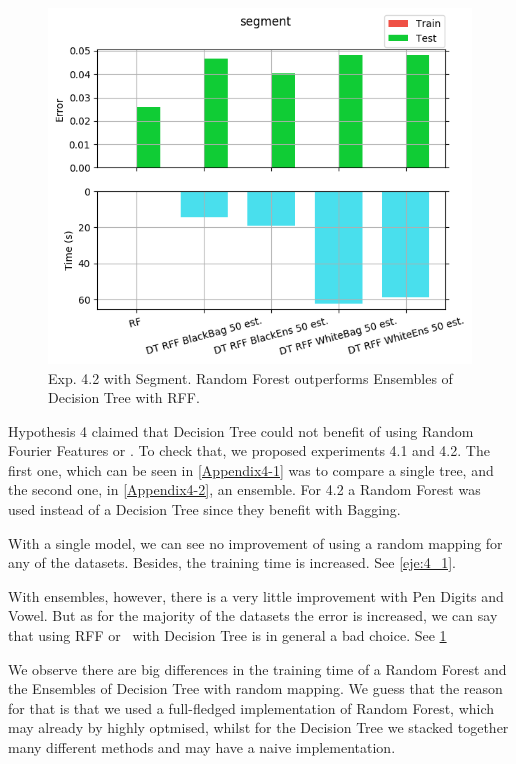 \begin{pre-delivery}
\begin{figure}[th]
\centering
\includegraphics[scale=0.6]{Figures/4_2/rff/segment}
\decoRule
\caption{Exp. 4.2 with Segment. Random Forest outperforms Ensembles of Decision Tree with RFF.}
\label{eje:4_2}
\end{figure}


Hypothesis 4 claimed that Decision Tree could not benefit of using
Random Fourier Features or \Nys. To check that, we proposed experiments
4.1 and 4.2. The first one, which can be seen in \ref{Appendix4-1} was
to compare a single tree, and the second one, in \ref{Appendix4-2}, an
ensemble. For 4.2 a Random Forest was used instead of a Decision Tree since
they benefit with Bagging.

With a single model, we can see no improvement of using a random mapping for
any of the datasets. Besides, the training time is increased. See \ref{eje:4_1}.

With ensembles, however, there is a very little improvement with
Pen Digits and Vowel. But as for the majority of the datasets the error is
increased, we can say that using RFF or \Nys\ with Decision Tree is in
general a bad choice. See \ref{eje:4_2}

We observe there are big differences in the training time of a Random Forest
and the Ensembles of Decision Tree with random mapping. We guess that the
reason for that is that
we used a full-fledged implementation of Random Forest, which may already
by highly optmised, whilst for the Decision Tree we stacked together
many different methods and may have a naive implementation.


\end{pre-delivery}

